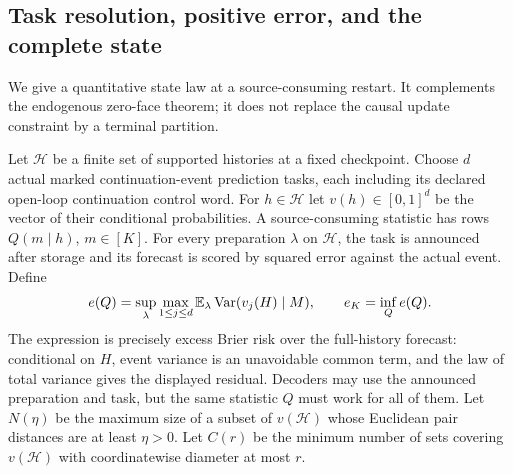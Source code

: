 \subsection{Task resolution, positive error, and the complete state}
\label{sec:v15-task}
We give a quantitative state law at a source-consuming restart. It
complements the endogenous zero-face theorem; it does not replace the
causal update constraint by a terminal partition.

Let $\mathcal H$ be a finite set of supported histories at a fixed
checkpoint. Choose $d$ actual marked continuation-event prediction
tasks, each including its declared open-loop continuation control word.
For $h\in\mathcal H$ let $v(h)\in[0,1]^d$ be the vector of their
conditional probabilities. A source-consuming statistic has rows
$Q(m\mid h)$, $m\in[K]$. For every preparation $\lambda$ on
$\mathcal H$, the task is announced after storage and its forecast is
scored by squared error against the actual event. Define
\[
 e(Q)=\sup_\lambda\max_{1\le j\le d}
       \mathbb E_\lambda\operatorname{Var}(v_j(H)\mid M),\qquad
 e_K=\inf_Q e(Q).
\]
The expression is precisely excess Brier risk over the full-history
forecast: conditional on $H$, event variance is an unavoidable common
term, and the law of total variance gives the displayed residual.
Decoders may use the announced preparation and task, but the same
statistic $Q$ must work for all of them. Let $N(\eta)$ be the maximum
size of a subset of $v(\mathcal H)$ whose Euclidean pair distances are
at least $\eta>0$. Let $C(r)$ be the minimum number of sets covering
$v(\mathcal H)$ with coordinatewise diameter at most $r$.

